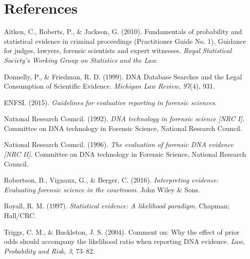 \documentclass[10pt,dvipsnames,enabledeprecatedfontcommands]{scrartcl}
\begin{document}
\section*{References}\label{references}

\hypertarget{refs}{}
\hypertarget{ref-aitken2010fundamentals}{}
Aitken, C., Roberts, P., \& Jackson, G. (2010). Fundamentals of
probability and statistical evidence in criminal proceedings
(Practitioner Guide No. 1), Guidance for judges, lawyers, forensic
scientists and expert witnesses. \emph{Royal Statistical Society's
Working Group on Statistics and the Law}.

\hypertarget{ref-donnelly1999DNADatabaseSearches}{}
Donnelly, P., \& Friedman, R. D. (1999). DNA Database Searches and the
Legal Consumption of Scientific Evidence. \emph{Michigan Law Review},
\emph{97}(4), 931.

\hypertarget{ref-enfs2015}{}
ENFSI. (2015). \emph{Guidelines for evaluative reporting in forensic
sciences}.

\hypertarget{ref-NRCI1992}{}
National Research Council. (1992). \emph{DNA technology in forensic
science \textup{{[}NRC I{]}}}. Committee on DNA technology in Forensic
Science, National Research Council.

\hypertarget{ref-NRCII1996}{}
National Research Council. (1996). \emph{The evaluation of forensic DNA
evidence \textup{{[}NRC II{]}}}. Committee on DNA technology in Forensic
Science, National Research Council.

\hypertarget{ref-robertson2016interpreting}{}
Robertson, B., Vignaux, G., \& Berger, C. (2016). \emph{Interpreting
evidence: Evaluating forensic science in the courtroom}. John Wiley \&
Sons.

\hypertarget{ref-Royall1997}{}
Royall, R. M. (1997). \emph{Statistical evidence: A likelihood
paradigm}. Chapman; Hall/CRC.

\hypertarget{ref-triggsCommentWhyEffecta}{}
Triggs, C. M., \& Buckleton, J. S. (2004). Comment on: Why the effect of
prior odds should accompany the likelihood ratio when reporting DNA
evidence. \emph{Law, Probability and Risk}, \emph{3}, 73--82.
\end{document}
